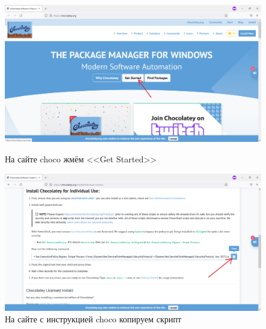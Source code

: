 \begin{figure}[!p]
    \centering
    \begin{minipage}{0.47\textwidth}
        \centering
        \includegraphics[width=\linewidth]
            {_assets/gpi_pz_choco_1.png}
        \caption{На сайте choco жмём <<Get Started>>}
        \label{fig:gpi_pz_choco_1}
    \end{minipage}
    \begin{minipage}{0.47\textwidth}
        \centering
        \includegraphics[width=\linewidth]
            {_assets/gpi_pz_choco_2.png}
        \caption{На сайте с инструкцией choco копируем скрипт}
        \label{fig:gpi_pz_choco_2}
    \end{minipage}
\end{figure}

